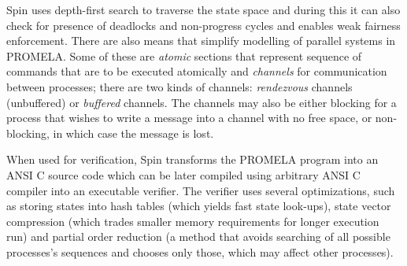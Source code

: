 Spin uses depth-first search to traverse the state space and during this it can also check for presence of deadlocks and non-progress cycles and enables weak fairness enforcement. There are also means that simplify modelling of parallel systems in PROMELA. Some of these are \emph{atomic} sections that represent sequence of commands that are to be executed atomically and \emph{channels} for communication between processes; there are two kinds of channels: \emph{rendezvous} channels (unbuffered) or \emph{buffered} channels. The channels may also be either blocking for a process that wishes to write a message into a channel with no free space, or non-blocking, in which case the message is lost.

When used for verification, Spin transforms the PROMELA program into an ANSI C source code which can be later compiled using arbitrary ANSI C compiler into an executable verifier. The verifier uses several optimizations, such as storing states into hash tables (which yields fast state look-ups), state vector compression (which trades smaller memory requirements for longer execution run) and partial order reduction (a method that avoids searching of all possible processes's sequences and chooses only those, which may affect other processes).


